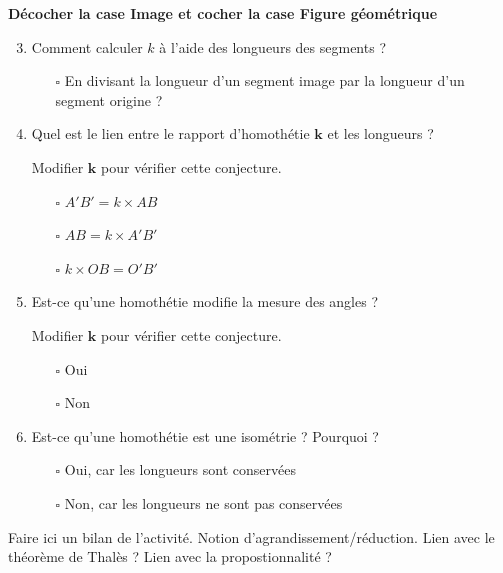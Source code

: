 \begin{activite}
    {\bfseries Décocher la case \og Image \fg et cocher la case \og Figure géométrique \fg}    
    \begin{enumerate}
        \setcounter{enumi}{2}
        \item Comment calculer $k$ à l'aide des longueurs des segments ?
        \begin{itemize}            
            \item[$\square$] En divisant la longueur d'un segment image par la longueur d'un segment origine ?
        \end{itemize}
        \item Quel est le lien entre le rapport d'homothétie $\mathbf{k}$ et les longueurs ?
        
        Modifier $\mathbf{k}$ pour vérifier cette conjecture.
        \begin{itemize}
            \item[$\square$] $A'B' = k\times AB$
            \item[$\square$] $AB = k\times A'B'$
            \item[$\square$] $k\times OB = O'B'$
        \end{itemize}
        \item Est-ce qu'une homothétie modifie la mesure des angles ?
        
        Modifier $\mathbf{k}$ pour vérifier cette conjecture.
        \begin{itemize}
            \item[$\square$] Oui
            \item[$\square$] Non            
        \end{itemize}
        \item Est-ce qu'une homothétie est une isométrie ? Pourquoi ?
        \begin{itemize}
            \item[$\square$] Oui, car les longueurs sont conservées
            \item[$\square$] Non,  car les longueurs ne sont pas conservées
        \end{itemize}
    \end{enumerate}

    Faire ici un bilan de l'activité. Notion d'agrandissement/réduction. Lien avec le théorème de Thalès ? Lien avec la propostionnalité ?

\end{activite}